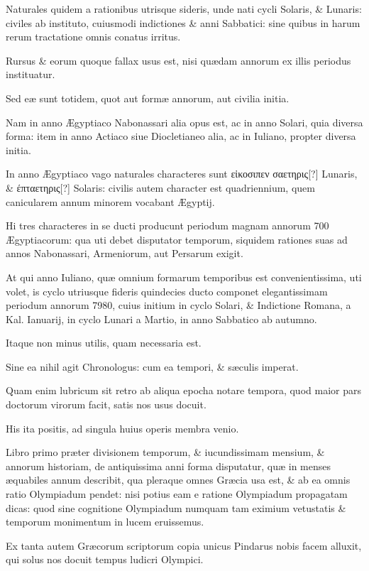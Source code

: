 \begin{parnumbers}
Naturales quidem a rationibus utrisque sideris, unde nati cycli Solaris, \& Lunaris: civiles ab instituto, cuiusmodi indictiones \& anni Sabbatici: sine quibus in harum rerum tractatione omnis conatus irritus. 

Rursus \& eorum quoque fallax usus est, nisi quædam annorum ex illis periodus instituatur.

Sed eæ sunt totidem, quot aut formæ annorum, aut civilia initia.

Nam in anno Ægyptiaco Nabonassari alia opus est, ac in anno Solari, quia diversa forma: item in anno Actiaco siue Diocletianeo alia, ac in Iuliano, propter diversa initia.

In anno Ægyptiaco vago naturales characteres sunt \textgreek{εἰκοσιπεν σαετηρις[?]} Lunaris, \& \textgreek{έπταετηρις[?]} Solaris: civilis autem character est quadriennium, quem canicularem annum minorem vocabant Ægyptij.

Hi tres characteres in se ducti producunt periodum magnam annorum 700 Ægyptiacorum: qua uti debet disputator temporum, siquidem rationes suas ad annos Nabonassari, Armeniorum, aut Persarum exigit.

At qui anno Iuliano, quæ omnium formarum temporibus est convenientissima, uti volet, is cyclo utriusque fideris quindecies ducto componet elegantissimam periodum annorum 7980, cuius initium in cyclo Solari, \& Indictione Romana, a Kal. Ianuarij, in cyclo Lunari a Martio, in anno Sabbatico ab autumno.

Itaque non minus utilis, quam necessaria est.

Sine ea nihil agit Chronologus: cum ea tempori, \& sæculis imperat.

Quam enim lubricum sit retro ab aliqua epocha notare tempora, quod maior pars doctorum virorum facit, satis nos usus docuit.

His ita positis, ad singula huius operis membra venio.

Libro primo præter divisionem temporum, \& iucundissimam mensium, \& annorum historiam, de antiquissima anni forma disputatur, quæ in menses æquabiles annum describit, qua pleraque omnes Græcia usa est, \& ab ea omnis ratio Olympiadum pendet: nisi potius eam e ratione Olympiadum propagatam dicas: quod sine cognitione Olympiadum numquam tam eximium vetustatis \& 
temporum monimentum in lucem eruissemus. 

Ex tanta autem Græcorum scriptorum copia unicus Pindarus nobis facem alluxit, qui solus nos docuit tempus ludicri Olympici.


\end{parnumbers}
